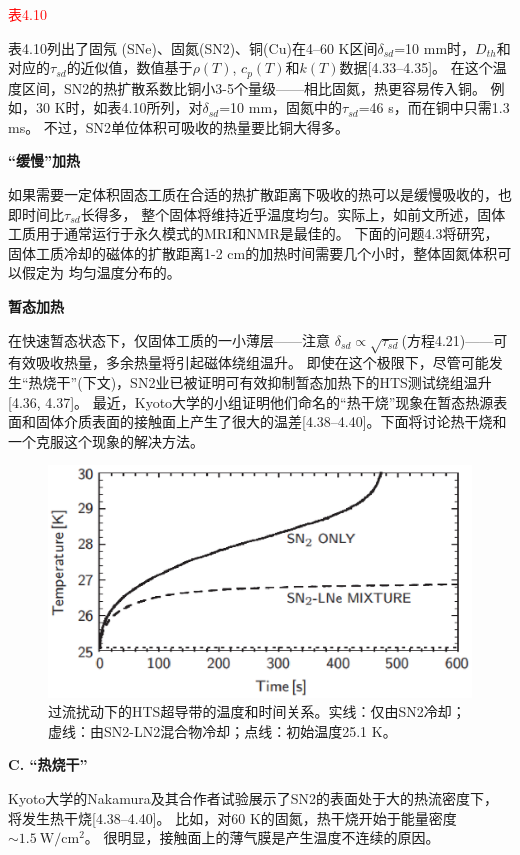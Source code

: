 \textcolor{red}{表4.10}

表4.10列出了固氖 (SNe)、固氮(SN2)、铜(Cu)在4–60 K区间$\delta_{sd}$=10 mm时，$D_{th}$和对应的$\tau_{sd}$的近似值，数值基于$\rho(T)$, $c_p(T)$和$k(T)$数据[4.33–4.35]。
在这个温度区间，SN2的热扩散系数比铜小3-5个量级——相比固氮，热更容易传入铜。
例如，30 K时，如表4.10所列，对$\delta_{sd}$=10 mm，固氮中的$\tau_{sd}$=46 s，而在铜中只需1.3 ms。
不过，SN2单位体积可吸收的热量要比铜大得多。

\textbf{“缓慢”加热}

如果需要一定体积固态工质在合适的热扩散距离下吸收的热可以是缓慢吸收的，也即时间比$\tau_{sd}$长得多，
整个固体将维持近乎温度均匀。实际上，如前文所述，固体工质用于通常运行于永久模式的MRI和NMR是最佳的。
下面的问题4.3将研究，固体工质冷却的磁体的扩散距离1-2 cm的加热时间需要几个小时，整体固氮体积可以假定为
均匀温度分布的。

\textbf{暂态加热}

在快速暂态状态下，仅固体工质的一小薄层——注意
$\delta_{sd}\propto\sqrt{\tau_{sd}}$(方程4.21)——可有效吸收热量，多余热量将引起磁体绕组温升。
即使在这个极限下，尽管可能发生“热烧干”(下文)，SN2业已被证明可有效抑制暂态加热下的HTS测试绕组温升[4.36, 4.37]。
最近，Kyoto大学的小组证明他们命名的“热干烧”现象在暂态热源表面和固体介质表面的接触面上产生了很大的温差[4.38–4.40]。下面将讨论热干烧和一个克服这个现象的解决方法。

\begin{figure}[htbp]
	\centering
	\includegraphics[scale=0.7]{chpt4/figs/fig4.17.eps}
	\caption{过流扰动下的HTS超导带的温度和时间关系。实线：仅由SN2冷却；虚线：由SN2-LN2混合物冷却；点线：初始温度25.1 K。}
\end{figure}


\textbf{C. “热烧干”}

Kyoto大学的Nakamura及其合作者试验展示了SN2的表面处于大的热流密度下，将发生热干烧[4.38–4.40]。
比如，对60 K的固氮，热干烧开始于能量密度$\sim 1.5\ \mathrm{W/cm^2}$。
很明显，接触面上的薄气膜是产生温度不连续的原因。

